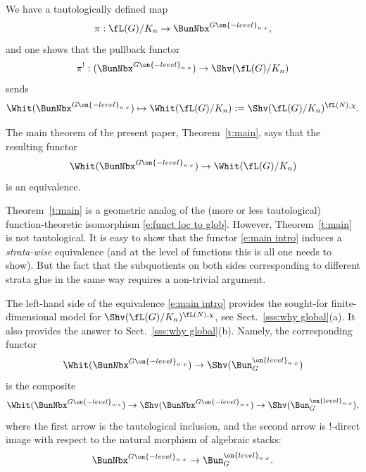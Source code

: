 \documentclass[9pt]{amsart}
\theoremstyle{definition}
\theoremstyle{remark}
\newcommand{\thmref}[1]{Theorem~\ref{#1}}
\newcommand{\secref}[1]{Sect.~\ref{#1}}
\numberwithin{equation}{section}
\begin{document}
\sssec{}

We have a tautologically defined map
$$\pi:\fL(G)/K_n\to \BunNbx^{G\on{-level}_{n\cdot x}},$$
and one shows that the pullback functor
$$\pi^!:(\BunNbx^{G\on{-level}_{n\cdot x}})\to \Shv(\fL(G)/K_n)$$
sends
$$\Whit(\BunNbx^{G\on{-level}_{n\cdot x}})\mapsto \Whit(\fL(G)/K_n):=\Shv(\fL(G)/K_n)^{\fL(N),\chi}.$$

The main theorem of the present paper, \thmref{t:main}, says that the resulting functor
\begin{equation} \label{e:main intro}
\Whit(\BunNbx^{G\on{-level}_{n\cdot x}})\to \Whit(\fL(G)/K_n)
\end{equation}
is an equivalence.

\medskip

\thmref{t:main} is a geometric analog of the (more or less tautological) function-theoretic isomorphism
\eqref{e:funct loc to glob}. However, \thmref{t:main} is not tautological. It is easy to show that the functor
\eqref{e:main intro} induces a \emph{strata-wise} equivalence (and at the level of functions this is all one
needs to show). But the fact that the subquotients on both sides corresponding to different strata glue in
the same way requires a non-trivial argument. 

\sssec{}
 
The left-hand side of the equivalence \eqref{e:main intro} provides the sought-for finite-dimensional model for
$\Shv(\fL(G)/K_n)^{\fL(N),\chi}$, see \secref{sss:why global}(a). It also provides the answer to 
\secref{sss:why global}(b).  Namely, the corresponding functor
$$\Whit(\BunNbx^{G\on{-level}_{n\cdot x}})\to \Shv(\Bun_G^{\on{level}_{n\cdot x}})$$
is the composite 
$$\Whit(\BunNbx^{G\on{-level}_{n\cdot x}})\to \Shv(\BunNbx^{G\on{-level}_{n\cdot x}})\to \Shv(\Bun_G^{\on{level}_{n\cdot x}}),$$
where the first arrow is the tautological inclusion, and the second arrow is !-direct image with respect to the natural
morphism of algebraic stacks:
$$\BunNbx^{G\on{-level}_{n\cdot x}}\to \Bun_G^{\on{level}_{n\cdot x}}.$$
\end{document}
